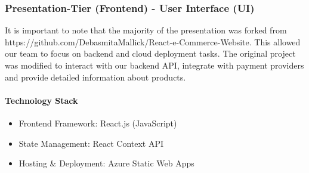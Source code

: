\documentclass{llncs}
\begin{document}
\subsubsection{Presentation-Tier (Frontend) - User Interface (UI)}

It is important to note that the majority of the presentation was forked from https://github.com/DebasmitaMallick/React-e-Commerce-Website.
This allowed our team to focus on backend and cloud deployment tasks. The original project was modified to interact with our backend API,
integrate with payment providers and provide detailed information about products.

\paragraph{Technology Stack}
\begin{itemize}
    \item Frontend Framework: React.js (JavaScript)
    \item State Management: React Context API
    \item Hosting \& Deployment: Azure Static Web Apps
\end{itemize}
\end{document}

